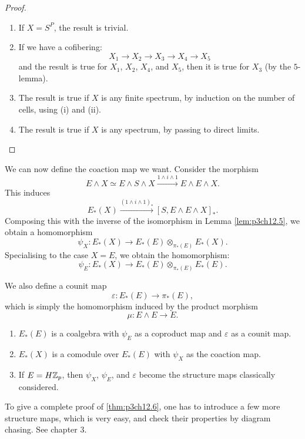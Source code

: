 \documentclass[../main]{subfiles}
\begin{document}
\begin{proof}

\begin{enumerate}
    \item If $X=S^P$, the result is trivial.
    \item If we have a cofibering:
    \[ X_1\longrightarrow X_2\longrightarrow X_3\longrightarrow X_4\longrightarrow X_5 \]
    and the result is true for $X_1$, $X_2$, $X_4$, and $X_5$, then it is true for $X_3$ (by the $5$-lemma).
    \item The result is true if $X$ is any finite spectrum, by induction on the number of cells, using (i) and (ii).
    \item The result is true if $X$ is any spectrum, by passing to direct limits.
\end{enumerate}

\end{proof}

We can now define the coaction map we want. Consider the morphism
\[ E\wedge X\simeq E\wedge S\wedge X\xrightarrow{1\wedge i\wedge 1}E\wedge E\wedge X . \]
This induces
\[ E_\ast(X)\xrightarrow{(1\wedge i\wedge 1)_\ast}[S,E\wedge E\wedge X]_\ast . \]
Composing this with the inverse of the isomorphism in Lemma \ref{lem:p3ch12.5}, we obtain a homomorphism
\[ \psi_X\colon E_\ast(X)\longrightarrow E_\ast(E)\otimes_{\pi_\ast(E)}E_\ast(X) . \]
Specialising to the case $X=E$, we obtain the homomorphism:
\[ \psi_E\colon E_\ast(X)\longrightarrow E_\ast(E)\otimes_{\pi_\ast(E)}E_\ast(E) . \]

We also define a counit map
\[ \varepsilon\colon E_\ast(E)\longrightarrow\pi_\ast(E) , \]
which is simply the homomorphism induced by the product morphism
\[ \mu\colon E\wedge E\longrightarrow E . \]

\begin{theorem} \label{thm:p3ch12.6}

\begin{enumerate}
    \item $E_\ast(E)$ is a coalgebra with $\psi_E$ as a coproduct map and $\varepsilon$ as a counit map.
    \item $E_\ast(X)$ is a comodule over $E_\ast(E)$ with $\psi_X$ as the coaction map.
    \item If $E=H\mathbb{Z}_p$, then $\psi_X$, $\psi_E$, and $\varepsilon$ become the structure maps classically considered.
\end{enumerate}

To give a complete proof of \ref{thm:p3ch12.6}, one has to introduce a few more structure maps, which is very easy, and check their properties by diagram chasing. See \cite{adams3} chapter 3.

\end{theorem}
\end{document}

